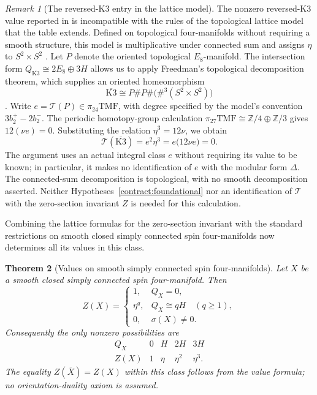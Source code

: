 \documentclass[11pt,a4paper]{amsart}
\newcommand{\Z}{\mathbb Z}
\newcommand{\TMF}{\mathrm{TMF}}
\theoremstyle{plain}
\newtheorem{theorem}{Theorem}[section]
\theoremstyle{definition}
\theoremstyle{remark}
\newtheorem{remark}[theorem]{Remark}
\begin{document}
\begin{remark}[The reversed-K3 entry in the lattice model]\label{rem:chae-reversed-K3}
The nonzero reversed-K3 value reported in
\cite[Section~2, Table~1]{Chae} is incompatible with the rules
of the topological lattice model that the table extends.
Defined on topological four-manifolds without requiring a
smooth structure, this model is multiplicative under connected
sum and assigns $\eta$ to $S^2\times S^2$
\cite[Section~2.7, equations (2.36)--(2.41)]{GPPV}.
Let $P$ denote the oriented topological $E_8$-manifold.
The intersection form
$Q_{\overline{\mathrm{K3}}}\cong2E_8\oplus3H$ allows us
to apply Freedman's topological decomposition theorem,
which supplies an oriented homeomorphism
\[
 \overline{\mathrm{K3}}\cong
 P\#P\#\bigl(\#^3(S^2\times S^2)\bigr)
\]
\cite[Theorems~1.5, 1.7 and 1.9]{Freedman}.
Write $e=\mathcal T(P)\in\pi_{24}\TMF$, with degree
specified by the model's convention $3b_2^+-2b_2^-$.
The periodic homotopy-group calculation
$\pi_{27}\TMF\cong\Z/4\oplus\Z/3$
\cite[Appendix~C.1, Tables~3 and~4]{TY} gives
$12(\nu e)=0$. Substituting the relation $\eta^3=12\nu$,
we obtain
\[
 \mathcal T(\overline{\mathrm{K3}})
 =e^2\eta^3=e\bigl(12\nu e\bigr)=0.
\]
The argument uses an actual integral class $e$ without
requiring its value to be known; in particular, it makes no
identification of $e$ with the modular form $\Delta$.
The connected-sum decomposition is topological, with no
smooth decomposition asserted. Neither
Hypotheses~\ref{contract:foundational} nor an identification
of $\mathcal T$ with the zero-section invariant $Z$ is
needed for this calculation.
\end{remark}

Combining the lattice formulas for the zero-section invariant
with the standard restrictions on smooth closed simply connected
spin four-manifolds now determines all its values in this class.

\begin{theorem}[Values on smooth simply connected spin four-manifolds]\label{thm:spin-classification}
Let $X$ be a smooth closed simply connected spin four-manifold. Then
\begin{equation}\label{eq:spin-classification}
 Z(X)=
 \begin{cases}
  1,&Q_X=0,\\
  \eta^q,&Q_X\cong qH\quad(q\ge1),\\
  0,&\sigma(X)\ne0.
 \end{cases}
\end{equation}
Consequently the only nonzero possibilities are
\[
\begin{array}{c|cccc}
 Q_X&0&H&2H&3H\\ \hline
 Z(X)&1&\eta&\eta^2&\eta^3.
\end{array}
\]
The equality $Z(\overline X)=Z(X)$ within this class
follows from the value formula; no orientation-duality axiom
is assumed.
\end{theorem}
\end{document}
